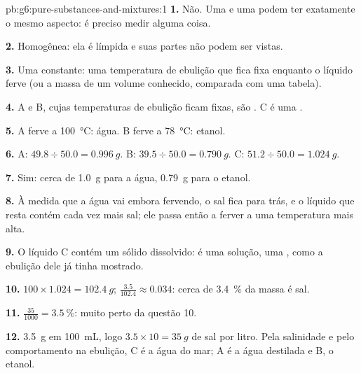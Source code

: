 \begin{solution}{pb:g6:pure-substances-and-mixtures:1}
\textbf{1.} Não. Uma  e uma  podem ter
exatamente o mesmo aspecto: é preciso medir alguma coisa.

\textbf{2.} Homogênea: ela é límpida e suas partes não podem ser vistas.

\textbf{3.} Uma constante: uma temperatura de ebulição que fica fixa
enquanto o líquido ferve (ou a massa de um volume conhecido, comparada
com uma tabela).

\textbf{4.} A e B, cujas temperaturas de ebulição ficam fixas, são
. C é uma .

\textbf{5.} A ferve a \qty{100}{\celsius}: água. B ferve a
\qty{78}{\celsius}: etanol.

\textbf{6.} A: $49.8 \div 50.0 = \qty{0.996}{g}$. B: $39.5 \div 50.0 =
\qty{0.790}{g}$. C: $51.2 \div 50.0 = \qty{1.024}{g}$.

\textbf{7.} Sim: cerca de \qty{1.0}{g} para a água, \qty{0.79}{g} para
o etanol.

\textbf{8.} À medida que a água vai embora fervendo, o sal fica para
trás, e o líquido que resta contém cada vez mais sal; ele passa então a
ferver a uma temperatura mais alta.

\textbf{9.} O líquido C contém um sólido dissolvido: é uma solução, uma
, como a ebulição dele já tinha mostrado.

\textbf{10.} $100 \times 1.024 = \qty{102.4}{g}$; $\frac{3.5}{102.4}
\approx 0.034$: cerca de \qty{3.4}{\percent} da massa é sal.

\textbf{11.} $\frac{35}{1000} = \qty{3.5}{\percent}$: muito perto da
questão 10.

\textbf{12.} \qty{3.5}{g} em \qty{100}{mL}, logo $3.5 \times 10 =
\qty{35}{g}$ de sal por litro. Pela salinidade e pelo comportamento na
ebulição, C é a água do mar; A é a água destilada e B, o etanol.
\end{solution}
